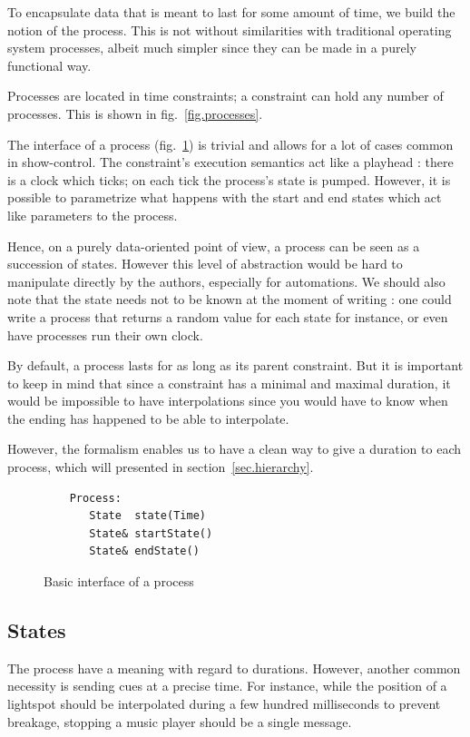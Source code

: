 \documentclass{sigchi}
\begin{document}
To encapsulate data that is meant to last for some amount of time, we build the notion of the process. This is not without similarities with traditional operating system processes, albeit much simpler since they can be made in a purely functional way.

Processes are located in time constraints; a constraint can hold any number of processes. This is shown in fig.~\ref{fig.processes}.

The interface of a process (fig.~\ref{fig.processInterface}) is trivial and allows for a lot of cases common in show-control. The constraint's execution semantics act like a playhead : there is a clock which ticks; on each tick the process's state is pumped. However, it is possible to parametrize what happens with the start and end states which act like parameters to the process. 

Hence, on a purely data-oriented point of view, a process can be seen as a succession of states. However this level of abstraction would be hard to manipulate directly by the authors, especially for automations. We should also note that the state needs not to be known at the moment of writing : one could write a process that returns a random value for each state for instance, or even have processes run their own clock.


By default, a process lasts for as long as its parent constraint. But it is important to keep in mind that since a constraint has a minimal and maximal duration, it would be impossible to have interpolations since you would have to know when the ending has happened to be able to interpolate. 

However, the formalism enables us to have a clean way to give a duration to each process, which will presented in section~\ref{sec.hierarchy}.

\begin{figure}
	\centering
\begin{lstlisting}
    Process:
       State  state(Time)
       State& startState()
       State& endState()
\end{lstlisting}
\caption{Basic interface of a process}
\label{fig.processInterface}
\end{figure}

\subsection{States}
The process have a meaning with regard to durations. However, another common necessity is sending cues at a precise time. For instance, while the position of a lightspot should be interpolated during a few hundred milliseconds to prevent breakage, stopping a music player should be a single message.
\end{document}
